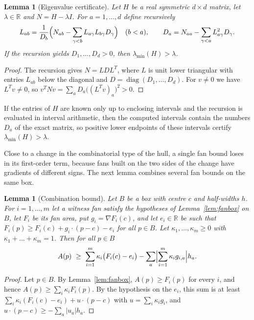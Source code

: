 \documentclass[11pt]{amsart}
\newtheorem{lemma}[theorem]{Lemma}
\theoremstyle{definition}
\theoremstyle{remark}
\numberwithin{equation}{section}
\newcommand{\R}{\mathbb{R}}
\newcommand{\lmin}{\lambda_{\min}}
\begin{document}
\begin{lemma}[Eigenvalue certificate]\label{lem:ldl}
Let $H$ be a real symmetric $d\times d$ matrix, let $\lambda\in\R$ and $N=H-\lambda I$. For $a=1,\dots,d$ define recursively
\[
L_{ab}=\frac1{D_b}\Bigl(N_{ab}-\sum_{\gamma<b}L_{a\gamma}L_{b\gamma}D_\gamma\Bigr)\quad(b<a),\qquad D_a=N_{aa}-\sum_{\gamma<a}L_{a\gamma}^2D_\gamma.
\]
If the recursion yields $D_1,\dots,D_d>0$, then $\lmin(H)>\lambda$.
\end{lemma}

\begin{proof}
The recursion gives $N=LDL^T$, where $L$ is unit lower triangular with entries $L_{ab}$ below the diagonal and $D=\operatorname{diag}(D_1,\dots,D_d)$. For $v\ne0$ we have $L^Tv\ne0$, so $v^TNv=\sum_aD_a\bigl((L^Tv)_a\bigr)^2>0$.
\end{proof}

If the entries of $H$ are known only up to enclosing intervals and the recursion is evaluated in interval arithmetic, then the computed intervals contain the numbers $D_a$ of the exact matrix, so positive lower endpoints of these intervals certify $\lmin(H)>\lambda$.

Close to a change in the combinatorial type of the hull, a single fan bound loses in its first-order term, because fans built on the two sides of the change have gradients of different signs. The next lemma combines several fan bounds on the same box.

\begin{lemma}[Combination bound]\label{lem:comb}
Let $B$ be a box with centre $c$ and half-widths $h$. For $i=1,\dots,m$ let a witness fan satisfy the hypotheses of Lemma~\textup{\ref{lem:fanbox}} on $B$, let $F_i$ be its fan area, put $g_i=\nabla F_i(c)$, and let $e_i\in\R$ be such that $F_i(p)\ge F_i(c)+g_i\cdot(p-c)-e_i$ for all $p\in B$. Let $\kappa_1,\dots,\kappa_m\ge0$ with $\kappa_1+\dots+\kappa_m=1$. Then for all $p\in B$
\[
A(p)\ \ge\ \sum_{i=1}^m\kappa_i\bigl(F_i(c)-e_i\bigr)-\sum_a\Bigl|\sum_{i=1}^m\kappa_ig_{i,a}\Bigr|h_a.
\]
\end{lemma}

\begin{proof}
Let $p\in B$. By Lemma~\ref{lem:fanbox}, $A(p)\ge F_i(p)$ for every $i$, and hence $A(p)\ge\sum_i\kappa_iF_i(p)$. By the hypothesis on the $e_i$, this sum is at least $\sum_i\kappa_i(F_i(c)-e_i)+u\cdot(p-c)$ with $u=\sum_i\kappa_ig_i$, and $u\cdot(p-c)\ge-\sum_a|u_a|h_a$.
\end{proof}
\end{document}
